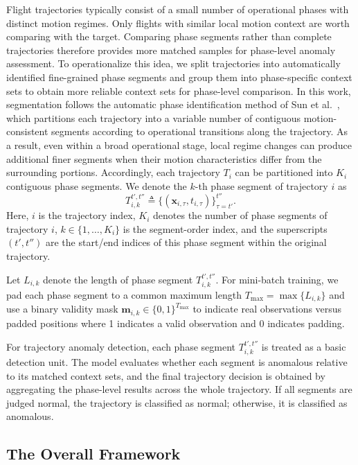 \documentclass[iicol,pdflatex,sn-basic,Numbered]{sn-jnl}%
\theoremstyle{thmstyleone}%
\theoremstyle{thmstyletwo}%
\theoremstyle{thmstylethree}%
\begin{document}
Flight trajectories typically consist of a small number of operational phases with distinct motion regimes. 
Only flights with similar local motion context are worth comparing with the target.
Comparing phase segments rather than complete trajectories therefore provides more matched samples for phase-level anomaly assessment.
To operationalize this idea, we split trajectories into automatically identified fine-grained phase segments and group them into phase-specific context sets to obtain more reliable context sets for phase-level comparison.
In this work, segmentation follows the automatic phase identification method of Sun et al.~\cite{sun2017phaseidentification}, which partitions each trajectory into a variable number of contiguous motion-consistent segments according to operational transitions along the trajectory. 
As a result, even within a broad operational stage, local regime changes can produce additional finer segments when their motion characteristics differ from the surrounding portions. 
Accordingly, each trajectory $T_i$ can be partitioned into $K_i$ contiguous phase segments.
We denote the $k$-th phase segment of trajectory $i$ as
\begin{equation}
T^{t',t''}_{i,k} \triangleq \{(\mathbf{x}_{i,\tau}, t_{i,\tau})\}_{\tau=t'}^{t''}.
\end{equation}
Here, $i$ is the trajectory index, $K_i$ denotes the number of phase segments of trajectory $i$, $k \in\{1,\ldots,K_i\}$ is the segment-order index, and the superscripts $(t',t'')$ are the start/end indices of this phase segment within the original trajectory.

Let $L_{i,k}$ denote the length of phase segment $T^{t',t''}_{i,k}$.
For mini-batch training, we pad each phase segment to a common maximum length
$T_{\max}=\max\{L_{i,k}\}$ and use a binary validity mask $\mathbf{m}_{i,k}\in\{0,1\}^{T_{\max}}$ to indicate real observations versus padded positions where 1 indicates a valid observation and 0 indicates padding.

For trajectory anomaly detection, each phase segment $T^{t',t''}_{i,k}$ is treated as a basic detection unit.
The model evaluates whether each segment is anomalous relative to its matched context sets, and the final trajectory decision is obtained by aggregating the phase-level results across the whole trajectory.
If all segments are judged normal, the trajectory is classified as normal; otherwise, it is classified as anomalous.

\subsection{The Overall Framework}
\end{document}
